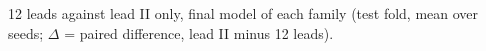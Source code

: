 \begin{table}[htbp]
\centering
\caption[12 leads against lead II]{12 leads against lead II only, final model of each family (test fold, mean over seeds; $\Delta$ = paired difference, lead II minus 12 leads).}
\label{tab:leads}
\small
\begin{adjustbox}{max width=\textwidth}

\end{adjustbox}
\end{table}
